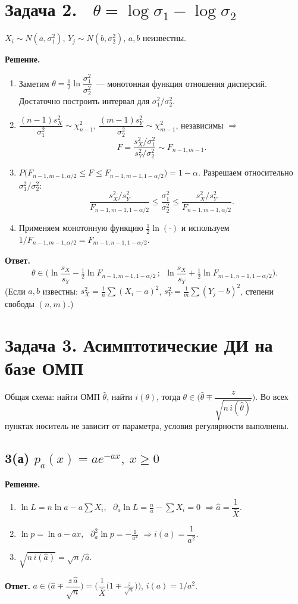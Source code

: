 \documentclass[12pt,a4paper]{article}
\newcommand{\sol}{\par\noindent\textbf{Решение.} }
\newcommand{\ans}{\par\smallskip\noindent\textbf{Ответ.} }
\begin{document}
\section*{Задача 2. \ $\theta=\log\sigma_1-\log\sigma_2$}
$X_i\sim N(a,\sigma_1^2)$, $Y_j\sim N(b,\sigma_2^2)$, $a,b$ неизвестны.

\sol
\begin{enumerate}
  \item Заметим $\theta=\frac12\ln\dfrac{\sigma_1^2}{\sigma_2^2}$~---
        монотонная функция отношения дисперсий. Достаточно построить
        интервал для $\sigma_1^2/\sigma_2^2$.
  \item $\dfrac{(n-1)s_X^2}{\sigma_1^2}\sim\chi^2_{n-1}$,
        $\dfrac{(m-1)s_Y^2}{\sigma_2^2}\sim\chi^2_{m-1}$, независимы
        $\Rightarrow$
  \[
    F=\frac{s_X^2/\sigma_1^2}{s_Y^2/\sigma_2^2}\sim F_{n-1,m-1}.
  \]
  \item $P\big(F_{n-1,m-1,\alpha/2}\le F\le F_{n-1,m-1,1-\alpha/2}\big)=1-\alpha$.
        Разрешаем относительно $\sigma_1^2/\sigma_2^2$:
  \[
    \frac{s_X^2/s_Y^2}{F_{n-1,m-1,1-\alpha/2}}\le\frac{\sigma_1^2}{\sigma_2^2}
    \le\frac{s_X^2/s_Y^2}{F_{n-1,m-1,\alpha/2}}.
  \]
  \item Применяем монотонную функцию $\frac12\ln(\cdot)$ и используем
        $1/F_{n-1,m-1,\alpha/2}=F_{m-1,n-1,1-\alpha/2}$.
\end{enumerate}
\ans
\[
  \theta\in\Big(\ln\frac{s_X}{s_Y}-\tfrac12\ln F_{n-1,m-1,1-\alpha/2}\,;\ \
  \ln\frac{s_X}{s_Y}+\tfrac12\ln F_{m-1,n-1,1-\alpha/2}\Big).
\]
(Если $a,b$ известны: $s_X^2=\frac1n\sum(X_i-a)^2$, $s_Y^2=\frac1m\sum(Y_j-b)^2$,
степени свободы $(n,m)$.)

\section*{Задача 3. Асимптотические ДИ на базе ОМП}

Общая схема: найти ОМП $\hat\theta$, найти $i(\theta)$, тогда
$\theta\in\Big(\hat\theta\mp\dfrac{z}{\sqrt{n\,i(\hat\theta)}}\Big)$.
Во всех пунктах носитель не зависит от параметра, условия регулярности
выполнены.

\subsection*{3(а) \quad $p_a(x)=ae^{-ax},\ x\ge0$}
\sol
\begin{enumerate}
  \item $\ln L=n\ln a-a\sum X_i$, \ $\partial_a\ln L=\frac na-\sum X_i=0$
        $\Rightarrow\hat a=\dfrac1{\bar X}$.
  \item $\ln p=\ln a-ax$, \ $\partial_a^2\ln p=-\frac1{a^2}$
        $\Rightarrow i(a)=\dfrac1{a^2}$.
  \item $\sqrt{n\,i(\hat a)}=\sqrt n/\hat a$.
\end{enumerate}
\ans $a\in\Big(\hat a\mp\dfrac{z\,\hat a}{\sqrt n}\Big)
     =\Big(\dfrac1{\bar X}\big(1\mp\tfrac{z}{\sqrt n}\big)\Big)$,
     \quad $i(a)=1/a^2$.
\end{document}
